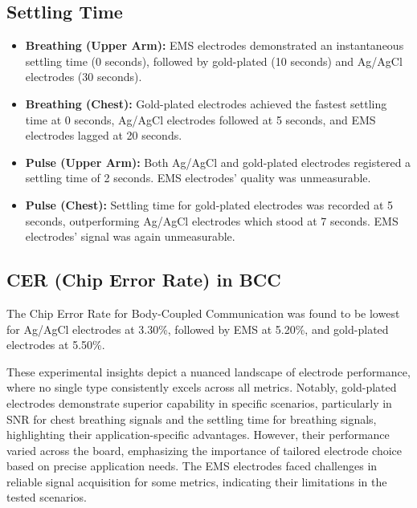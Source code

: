 \documentclass[conference]{IEEEtran}
\begin{document}
\subsection{Settling Time}

\begin{itemize}
    \item \textbf{Breathing (Upper Arm):} EMS electrodes demonstrated an instantaneous settling time (0 seconds), followed by gold-plated (10 seconds) and Ag/AgCl electrodes (30 seconds).
    \item \textbf{Breathing (Chest):} Gold-plated electrodes achieved the fastest settling time at 0 seconds, Ag/AgCl electrodes followed at 5 seconds, and EMS electrodes lagged at 20 seconds.
    \item \textbf{Pulse (Upper Arm):} Both Ag/AgCl and gold-plated electrodes registered a settling time of 2 seconds. EMS electrodes' quality was unmeasurable.
    \item \textbf{Pulse (Chest):} Settling time for gold-plated electrodes was recorded at 5 seconds, outperforming Ag/AgCl electrodes which stood at 7 seconds. EMS electrodes' signal was again unmeasurable.
\end{itemize}

\subsection{CER (Chip Error Rate) in BCC}

The Chip Error Rate for Body-Coupled Communication was found to be lowest for Ag/AgCl electrodes at 3.30\%, followed by EMS at 5.20\%, and gold-plated electrodes at 5.50\%.

These experimental insights depict a nuanced landscape of electrode performance, where no single type consistently excels across all metrics. Notably, gold-plated electrodes demonstrate superior capability in specific scenarios, particularly in SNR for chest breathing signals and the settling time for breathing signals, highlighting their application-specific advantages. However, their performance varied across the board, emphasizing the importance of tailored electrode choice based on precise application needs. The EMS electrodes faced challenges in reliable signal acquisition for some metrics, indicating their limitations in the tested scenarios.
\end{document}
